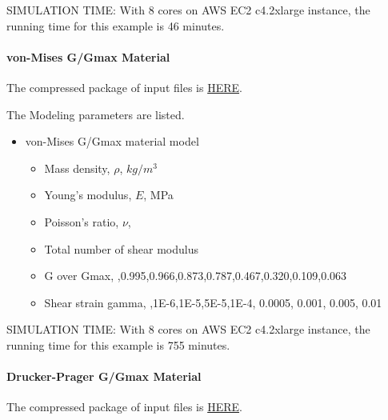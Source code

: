 SIMULATION TIME: With 8 cores on AWS EC2 c4.2xlarge instance, the running time for this example is 46 minutes.

\paragraph{von-Mises G/Gmax Material}
The compressed package of input files is  
\href{https://github.com/yuan-energy/Real-ESSI-Short-Course-Examples/tree/master/short-course-examples/nonlinear_analysis_steps/soil-structure/vonMisesGoverGmax/vonMisesGoverGmax.tgz?raw=true}{HERE}. 

The Modeling parameters are listed.
\begin{itemize}
  \item von-Mises G/Gmax material model 
  \begin{itemize}
    \item Mass density, $\rho$, \enspace {} $kg/m^3$
    \item Young's modulus, $E$, \enspace {} MPa
    \item Poisson's ratio, $\nu$, \enspace {}
    \item Total number of shear modulus \enspace {}
    \item G over Gmax, \enspace {},0.995,0.966,0.873,0.787,0.467,0.320,0.109,0.063
    \item Shear strain gamma, \enspace {},1E-6,1E-5,5E-5,1E-4, 0.0005, 0.001, 0.005, 0.01
  \end{itemize}
\end{itemize}

SIMULATION TIME: With 8 cores on AWS EC2 c4.2xlarge instance, the running time for this example is 755 minutes.

\paragraph{Drucker-Prager G/Gmax Material}
The compressed package of input files is  
\href{https://github.com/yuan-energy/Real-ESSI-Short-Course-Examples/tree/master/short-course-examples/nonlinear_analysis_steps/soil-structure/DruckerPragerGoverGmax/DruckerPragerGoverGmax.tgz?raw=true}{HERE}. 

